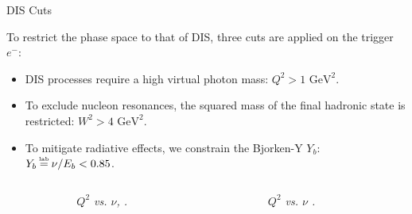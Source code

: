 \begin{frame}{DIS Cuts}
    \label{11.22::dis_cuts}

    To restrict the phase space to that of DIS, three cuts are applied on the trigger $e^-$:

    \begin{itemize}
        \item
            DIS processes require a high virtual photon mass: \textcolor{efd_red}{$Q^2 > 1 \text{ GeV}^2$}.

        \item
            To exclude nucleon resonances, the squared mass of the final hadronic state is restricted: \textcolor{efd_yellow}{$W^2 > 4 \text{ GeV}^2$}.

        \item
            To mitigate radiative effects, we constrain the Bjorken-Y $Y_b$: \textcolor{efd_blue}{$Y_b \labeq \nu/E_b < 0.85$}.
    \end{itemize}

    \vspace{-18pt}

    \begin{columns}[onlytextwidth,T]

    \begin{column}{.05\linewidth}\end{column} %

    \begin{column}{.40\linewidth}
        \begin{center}
            \begin{figure}[t]
                \scriptsize{\textit{$Q^2$ vs. $\nu$, .}}
            \end{figure}
        \end{center}
    \end{column}

    \begin{column}{.015\linewidth}\end{column} %

    \begin{column}{.40\linewidth}
        \begin{center}
            \begin{figure}[t]
                \scriptsize{\textit{$Q^2$ vs. $\nu$ .}}
            \end{figure}
        \end{center}
    \end{column}

    \begin{column}{.05\linewidth}\end{column} %

    \end{columns}
\end{frame}
